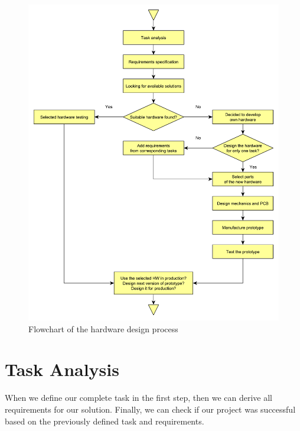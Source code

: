 \begin{figure}[H]
	\centering
	\label{fig:HWprocess}
	\caption{Flowchart of the hardware design process}
	\includegraphics[width=16cm]{img/HWdesignProcess.pdf}
\end{figure}

\section{Task Analysis}
\label{HWtaskAnalysis}
When we define our complete task in the first step, then we can derive all requirements for our solution. Finally, we can check if our project was successful based on the previously defined task and requirements.


